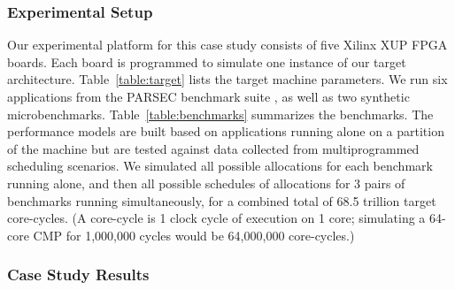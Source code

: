 

\subsubsection*{Experimental Setup}

Our experimental platform for this case study consists of five Xilinx
XUP FPGA boards. Each board is programmed to simulate one instance of
our target architecture.  Table~\ref{table:target} lists the target
machine parameters. We run six applications from the PARSEC benchmark
suite \cite{parsec}, as well as two synthetic microbenchmarks.
Table~\ref{table:benchmarks} summarizes the benchmarks. The
performance models are built based on applications running alone on a
partition of the machine but are tested against data collected from
multiprogrammed scheduling scenarios.  We simulated all possible
allocations for each benchmark running alone, and then all possible
schedules of allocations for 3 pairs of benchmarks running
simultaneously, for a combined total of 68.5 trillion target
core-cycles.  (A core-cycle is 1 clock cycle of execution on 1 core;
simulating a 64-core CMP for 1,000,000 cycles would be 64,000,000
core-cycles.)


\subsubsection*{Case Study Results}

